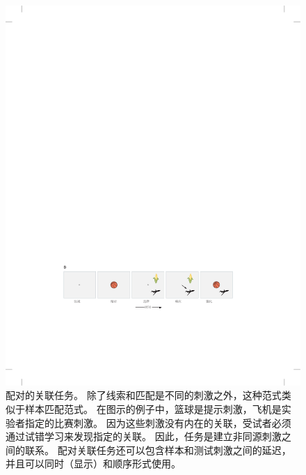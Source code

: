 \begin{figure}[htbp]
	\centering
	\includegraphics[width=0.9\linewidth]{chap24/fig_24_10_B}
	\caption{配对的关联任务。
		除了线索和匹配是不同的刺激之外，这种范式类似于样本匹配范式。
		在图示的例子中，篮球是提示刺激，飞机是实验者指定的比赛刺激。
		因为这些刺激没有内在的关联，受试者必须通过试错学习来发现指定的关联。
		因此，任务是建立非同源刺激之间的联系。
		配对关联任务还可以包含样本和测试刺激之间的延迟，并且可以同时（显示）和顺序形式使用。}
	\label{fig:24_10_b}
\end{figure}


